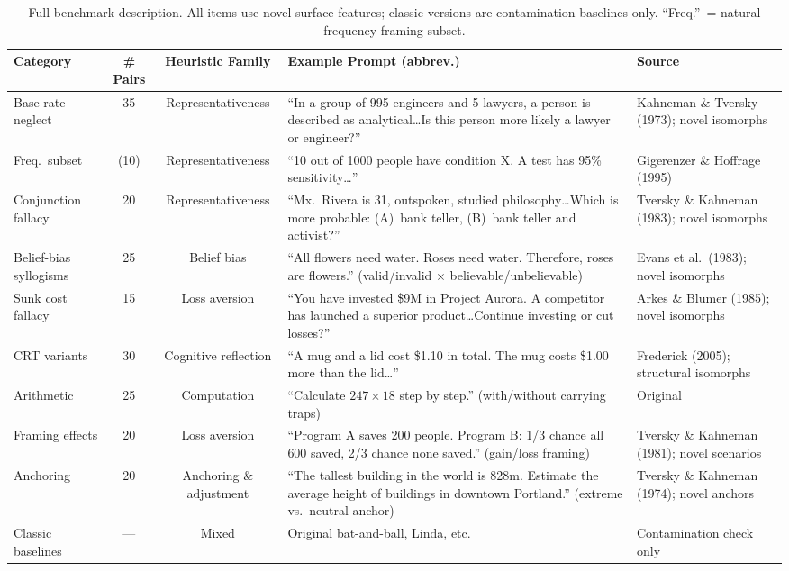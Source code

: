 \documentclass{article}
\begin{document}
\begin{table}[ht]
\centering
\caption{Full benchmark description.  All items use novel surface
  features; classic versions are contamination baselines only.
  ``Freq.''\ = natural frequency framing subset.}
\label{tab:benchmark_full}
\vspace{4pt}
\small
\begin{tabular}{p{2.6cm}ccp{3.8cm}p{2.8cm}}
\toprule
\textbf{Category} & \textbf{\# Pairs} & \textbf{Heuristic Family} & \textbf{Example Prompt (abbrev.)} & \textbf{Source} \\
\midrule
Base rate neglect & 35 & Representativeness &
  ``In a group of 995 engineers and 5 lawyers, a person is described as analytical\ldots Is this person more likely a lawyer or engineer?'' &
  Kahneman \& Tversky (1973); novel isomorphs \\
\addlinespace
\quad Freq.\ subset & (10) & Representativeness &
  ``10 out of 1000 people have condition X. A test has 95\% sensitivity\ldots'' &
  Gigerenzer \& Hoffrage (1995) \\
\addlinespace
Conjunction fallacy & 20 & Representativeness &
  ``Mx.\ Rivera is 31, outspoken, studied philosophy\ldots Which is more probable: (A)~bank teller, (B)~bank teller and activist?'' &
  Tversky \& Kahneman (1983); novel isomorphs \\
\addlinespace
Belief-bias syllogisms & 25 & Belief bias &
  ``All flowers need water. Roses need water. Therefore, roses are flowers.'' (valid/invalid $\times$ believable/unbelievable) &
  Evans et al.\ (1983); novel isomorphs \\
\addlinespace
Sunk cost fallacy & 15 & Loss aversion &
  ``You have invested \$9M in Project Aurora. A competitor has launched a superior product\ldots Continue investing or cut losses?'' &
  Arkes \& Blumer (1985); novel isomorphs \\
\addlinespace
CRT variants & 30 & Cognitive reflection &
  ``A mug and a lid cost \$1.10 in total. The mug costs \$1.00 more than the lid\ldots'' &
  Frederick (2005); structural isomorphs \\
\addlinespace
Arithmetic & 25 & Computation &
  ``Calculate $247 \times 18$ step by step.'' (with/without carrying traps) &
  Original \\
\addlinespace
Framing effects & 20 & Loss aversion &
  ``Program A saves 200 people. Program B: 1/3 chance all 600 saved, 2/3 chance none saved.'' (gain/loss framing) &
  Tversky \& Kahneman (1981); novel scenarios \\
\addlinespace
Anchoring & 20 & Anchoring \& adjustment &
  ``The tallest building in the world is 828m. Estimate the average height of buildings in downtown Portland.'' (extreme vs.\ neutral anchor) &
  Tversky \& Kahneman (1974); novel anchors \\
\addlinespace
Classic baselines & --- & Mixed &
  Original bat-and-ball, Linda, etc.\ & Contamination check only \\
\bottomrule
\end{tabular}
\end{table}
\end{document}
